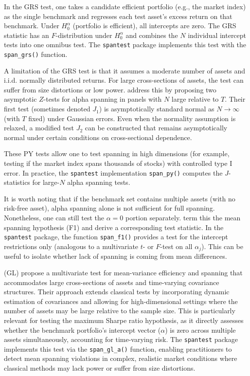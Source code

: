 In the GRS test, one takes a candidate efficient portfolio (e.g., the
market index) as the single benchmark and regresses each test asset's
excess return on that benchmark. Under \(H_0^\alpha\) (portfolio is
efficient), all intercepts are zero. The GRS statistic has an
\(F\)-distribution under \(H_0^\alpha\) and combines the \(N\) individual
intercept tests into one omnibus test. The \texttt{spantest} package implements
this test with the \texttt{span\_grs()} function.

A limitation of the GRS test is that it assumes a moderate number of
assets and i.i.d. normally distributed returns. For large cross-sections
of assets, the test can suffer from size distortions or low power.
\citet{PesaranYamagata2023} address this by proposing two asymptotic \(Z\)-tests
for alpha spanning in panels with \(N\) large relative to \(T\). Their first
test (sometimes denoted \(J_1\)) is asymptotically standard normal as
\(N \to \infty\) (with \(T\) fixed) under Gaussian errors. Even when the
normality assumption is relaxed, a modified test \(J_2\) can be
constructed that remains asymptotically normal under certain conditions
on cross-sectional dependence.

These PY tests allow one to test spanning in high dimensions (for
example, testing if the market index spans thousands of stocks) with
controlled type I error. In practice, the \texttt{spantest} implementation
\texttt{span\_py()} computes the \(J\)-statistics for large-\(N\) alpha spanning
tests.

It is worth noting that if the benchmark set contains multiple assets
(with no risk-free asset), alpha spanning alone is not sufficient for
full spanning. Nonetheless, one can still test the \(\alpha = 0\) portion
separately. \citet{KanZhou2012} term this the mean spanning hypothesis (F1) and
derive a corresponding test statistic. In the \texttt{spantest} package, the
function \texttt{span\_f1()} provides a test for the intercept restrictions only
(analogous to a multivariate \(t\)- or \(F\)-test on all \(\alpha_j\)). This
can be useful to isolate whether lack of spanning is coming from mean
differences.

\citet{GungorLuger2016} (GL) propose a multivariate test for mean-variance
efficiency and spanning that accommodates large cross-sections of assets
and time-varying covariance structures. Their approach extends classical
tests by incorporating dynamic estimation of covariances and allowing
for high-dimensional settings where the number of assets may be large
relative to the sample size. This is particularly relevant for testing
the maximum Sharpe ratio hypothesis, as it directly assesses whether the
benchmark portfolio's intercept vector (\(\alpha\)) is zero across
multiple assets simultaneously, accounting for time-varying risk. The
\texttt{spantest} package implements this test via the \texttt{span\_gl\_a()} function,
enabling practitioners to detect mean spanning violations in complex,
realistic market conditions where classical methods may lack power or
suffer from size distortions.

